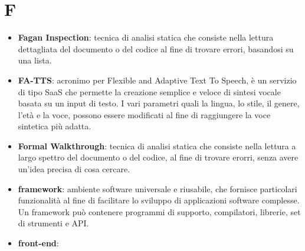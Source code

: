 \section{F}
\begin{itemize} 
	\item \textbf{Fagan Inspection}: tecnica di analisi statica che consiste nella lettura dettagliata del documento o del codice al fine di trovare errori, basandosi su una lista.
	\item \textbf{FA-TTS}: acronimo per Flexible and Adaptive Text To Speech, è un servizio di tipo SaaS che permette la creazione semplice e veloce di sintesi vocale basata su un input di testo. I vari parametri quali la lingua, lo stile, il genere, l'età e la voce, possono essere modificati al fine di raggiungere la voce sintetica più adatta.
	\item \textbf{Formal Walkthrough}: tecnica di analisi statica che consiste nella lettura a largo spettro del documento o del codice, al fine di trovare erorri, senza avere un'idea precisa di cosa cercare.
	\item \textbf{framework}: ambiente software universale e riusabile, che fornisce particolari funzionalità al fine di facilitare lo sviluppo di applicazioni software complesse. Un framework può contenere programmi di supporto, compilatori, librerie, set di strumenti e API.
 	\item \textbf{front-end}:
\end{itemize}